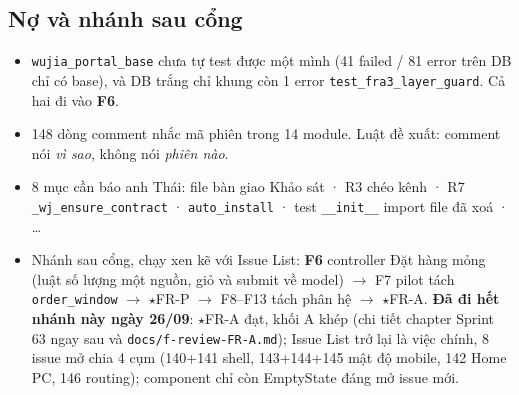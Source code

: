 \subsection*{Nợ và nhánh sau cổng}
\begin{itemize}[nosep]
\item \texttt{wujia\_portal\_base} chưa tự test được một mình (41 failed / 81 error trên DB chỉ có base), và DB trắng
  chỉ khung còn 1 error \texttt{test\_fra3\_layer\_guard}. Cả hai đi vào \textbf{F6}.
\item 148 dòng comment nhắc mã phiên trong 14 module. Luật đề xuất: comment nói \emph{vì sao}, không nói \emph{phiên nào}.
\item 8 mục cần báo anh Thái: file bàn giao Khảo sát · R3 chéo kênh · R7 \texttt{\_wj\_ensure\_contract} ·
  \texttt{auto\_install} · test \texttt{\_\_init\_\_} import file đã xoá · …
\item Nhánh sau cổng, chạy xen kẽ với Issue List: \textbf{F6} controller Đặt hàng mỏng (luật số lượng một nguồn,
  giỏ và submit về model) $\to$ F7 pilot tách \texttt{order\_window} $\to$ $\star$FR-P $\to$ F8--F13 tách phân hệ
  $\to$ $\star$FR-A. \textbf{Đã đi hết nhánh này ngày 26/09}: $\star$FR-A đạt, khối A khép (chi tiết chapter Sprint 63 ngay sau và
  \texttt{docs/f-review-FR-A.md}); Issue List trở lại là việc chính, 8 issue mở chia 4 cụm (140+141 shell, 143+144+145
  mật độ mobile, 142 Home PC, 146 routing); component chỉ còn EmptyState đáng mở issue mới.
\end{itemize}
